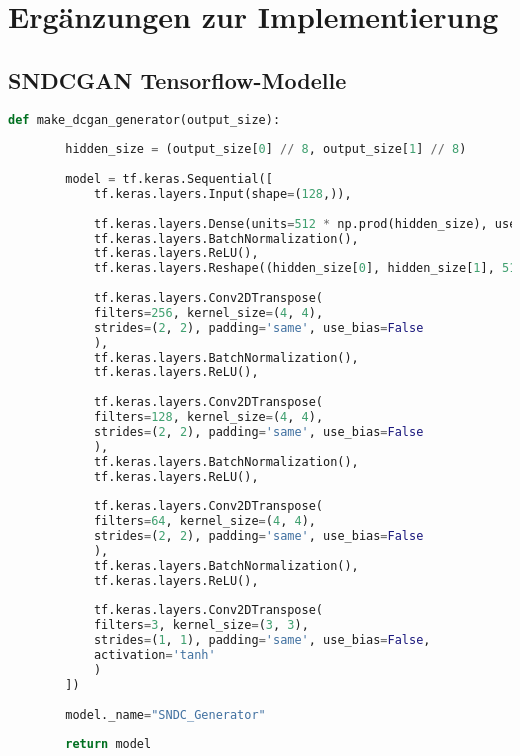 \chapter{Ergänzungen zur Implementierung}
\vspace*{-1\baselineskip}

\section{SNDCGAN Tensorflow-Modelle}

\begin{lstlisting}[language=Python, caption=SNDCGAN Generator, label=lst:sndcGenerator]
	def make_dcgan_generator(output_size):
	
		hidden_size = (output_size[0] // 8, output_size[1] // 8)
		
		model = tf.keras.Sequential([
			tf.keras.layers.Input(shape=(128,)),
			
			tf.keras.layers.Dense(units=512 * np.prod(hidden_size), use_bias=False),
			tf.keras.layers.BatchNormalization(),
			tf.keras.layers.ReLU(),
			tf.keras.layers.Reshape((hidden_size[0], hidden_size[1], 512)),
			
			tf.keras.layers.Conv2DTranspose(
			filters=256, kernel_size=(4, 4),
			strides=(2, 2), padding='same', use_bias=False
			),
			tf.keras.layers.BatchNormalization(),
			tf.keras.layers.ReLU(),
			
			tf.keras.layers.Conv2DTranspose(
			filters=128, kernel_size=(4, 4),
			strides=(2, 2), padding='same', use_bias=False
			),
			tf.keras.layers.BatchNormalization(),
			tf.keras.layers.ReLU(),
			
			tf.keras.layers.Conv2DTranspose(
			filters=64, kernel_size=(4, 4),
			strides=(2, 2), padding='same', use_bias=False
			),
			tf.keras.layers.BatchNormalization(),
			tf.keras.layers.ReLU(),
			
			tf.keras.layers.Conv2DTranspose(
			filters=3, kernel_size=(3, 3),
			strides=(1, 1), padding='same', use_bias=False,
			activation='tanh'
			)
		])
	
		model._name="SNDC_Generator"
	
		return model
\end{lstlisting}


